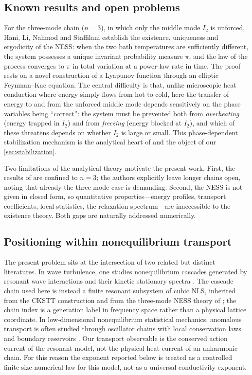 \documentclass[11pt,a4paper]{article}
\theoremstyle{definition}
\numberwithin{equation}{section}   %
\begin{document}
\subsection{Known results and open problems}\label{sec:known}

For the three-mode chain ($n=3$), in which only the middle mode $I_2$ is
unforced, Hani, Li, Nahmod and Staffilani \cite{HLNS} establish the existence,
uniqueness and ergodicity of the NESS: when the two bath temperatures are
sufficiently different, the system possesses a unique invariant probability
measure $\pi$, and the law of the process converges to $\pi$ in total variation
at a power-law rate in time. The proof rests on a novel construction of a
Lyapunov function through an elliptic Feynman--Kac equation. The central
difficulty is that, unlike microscopic heat conduction where energy simply flows
from hot to cold, here the transfer of energy to and from the unforced middle
mode depends sensitively on the phase variables being ``correct'': the system
must be prevented both from \emph{overheating} (energy trapped in $I_2$) and from
\emph{freezing} (energy blocked at $I_2$), and which of these threatens depends on
whether $I_2$ is large or small. This phase-dependent stabilization mechanism is
the analytical heart of \cite{HLNS} and the object of our \cref{sec:stabilization}.

Two limitations of the analytical theory motivate the present work. First, the
results of \cite{HLNS} are confined to $n=3$; the authors explicitly leave longer
chains open, noting that already the three-mode case is demanding. Second, the
NESS is not given in closed form, so quantitative properties---energy profiles,
transport coefficients, local statistics, the relaxation spectrum---are
inaccessible to the existence theory. Both gaps are naturally addressed
numerically.

\subsection{Positioning within nonequilibrium transport}
\label{sec:positioning}

The present problem sits at the intersection of two related but distinct
literatures. In wave turbulence, one studies nonequilibrium cascades generated
by resonant wave interactions and their kinetic stationary spectra
\cite{Nazarenko}. The cascade chain used here is instead a finite resonant
subsystem of cubic NLS, inherited from the CKSTT construction \cite{CKSTT} and
from the three-mode NESS theory of \cite{HLNS}; the chain index is a generation
label in frequency space rather than a physical lattice coordinate. In
low-dimensional nonequilibrium statistical mechanics, anomalous transport is
often studied through oscillator chains with local conservation laws and
boundary reservoirs \cite{LepriLiviPoliti,Dhar2008,Spohn2014}. Our transport
observable is the conserved action current of the resonant model, not the
physical heat current of an anharmonic chain. For this reason the exponent
reported below is treated as a controlled finite-size numerical law for this
model, not as a universal conductivity exponent.
\end{document}
